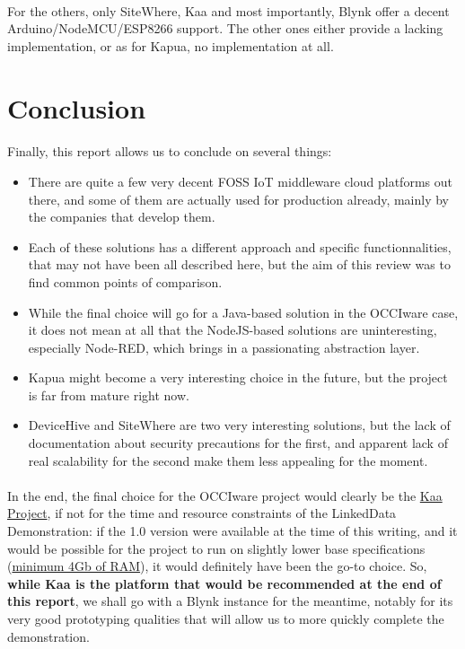 \documentclass{article}
\begin{document}
\paragraph{} For the others, only SiteWhere, Kaa and most importantly, Blynk offer a decent Arduino/NodeMCU/ESP8266 support. The other ones either provide a lacking implementation, or as for Kapua, no implementation at all.

\newpage

\section*{Conclusion}
%

\paragraph{} Finally, this report allows us to conclude on several things:

\begin{itemize}
\item There are quite a few very decent FOSS IoT middleware cloud platforms out there, and some of them are actually used for production already, mainly by the companies that develop them.
\item Each of these solutions has a different approach and specific functionnalities, that may not have been all described here, but the aim of this review was to find common points of comparison.
\item While the final choice will go for a Java-based solution in the OCCIware case, it does not mean at all that the NodeJS-based solutions are uninteresting, especially Node-RED, which brings in a passionating abstraction layer.
\item Kapua might become a very interesting choice in the future, but the project is far from mature right now.
\item DeviceHive and SiteWhere are two very interesting solutions, but the lack of documentation about security precautions for the first, and apparent lack of real scalability for the second make them less appealing for the moment.
\end{itemize}

\paragraph{} In the end, the final choice for the OCCIware project would clearly be the \href{https://www.kaaproject.org/}{Kaa Project}, if not for the time and resource constraints of the LinkedData Demonstration: if the 1.0 version were available at the time of this writing, and it would be possible for the project to run on slightly lower base specifications (\href{https://kaaproject.github.io/kaa/docs/v0.10.0/Getting-started/#sandbox-installation}{minimum 4Gb of RAM}), it would definitely have been the go-to choice. So, \textbf{while Kaa is the platform that would be recommended at the end of this report}, we shall go with a Blynk instance for the meantime, notably for its very good prototyping qualities that will allow us to more quickly complete the demonstration.
\end{document}
